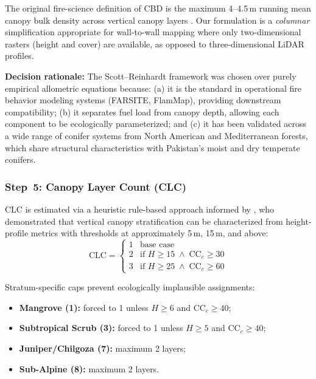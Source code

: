 \documentclass[12pt,a4paper,twoside]{article}
\newcommand{\CCc}{\text{CC}_{c}}
\newcommand{\CLC}{\text{CLC}}
\begin{document}
The original fire-science definition of CBD is the maximum 4--4.5\,m running mean
canopy bulk density across vertical canopy layers \citep{Scott2001,Sando1972}.  Our
formulation is a \textit{columnar} simplification appropriate for wall-to-wall
mapping where only two-dimensional rasters (height and cover) are available, as
opposed to three-dimensional LiDAR profiles.

\textbf{Decision rationale:} The Scott--Reinhardt framework was chosen over purely
empirical allometric equations because: (a) it is the standard in operational fire
behavior modeling systems (FARSITE, FlamMap), providing downstream compatibility;
(b) it separates fuel load from canopy depth, allowing each component to be
ecologically parameterized; and (c) it has been validated across a wide range of
conifer systems from North American and Mediterranean forests, which share structural
characteristics with Pakistan's moist and dry temperate conifers.

\subsubsection{Step~5: Canopy Layer Count (CLC)}\label{sec:clc}

CLC is estimated via a heuristic rule-based approach informed by
\citet{Whitehurst2013}, who demonstrated that vertical canopy stratification can
be characterized from height-profile metrics with thresholds at approximately 5\,m,
15\,m, and above:
\begin{equation}
  \CLC =
  \begin{cases}
    1 & \text{base case} \\
    2 & \text{if } H \geq 15 \;\land\; \CCc \geq 30 \\
    3 & \text{if } H \geq 25 \;\land\; \CCc \geq 60
  \end{cases}
  \label{eq:clc}
\end{equation}

Stratum-specific caps prevent ecologically implausible assignments:
\begin{itemize}[nosep]
  \item \textbf{Mangrove (1):} forced to 1 unless $H \geq 6$ and $\CCc \geq 40$;
  \item \textbf{Subtropical Scrub (3):} forced to 1 unless $H \geq 5$ and $\CCc \geq 40$;
  \item \textbf{Juniper/Chilgoza (7):} maximum 2 layers;
  \item \textbf{Sub-Alpine (8):} maximum 2 layers.
\end{itemize}
\end{document}
